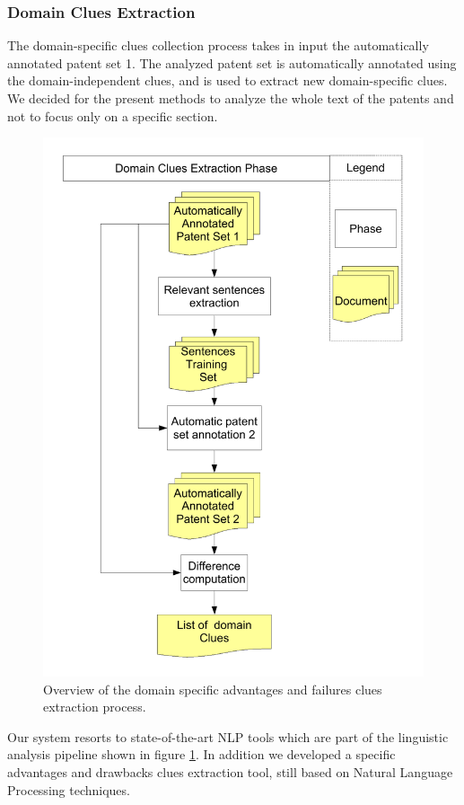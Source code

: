 \documentclass[]{book}
\begin{document}
\subsubsection{Domain Clues
Extraction}\label{advdrwarticledomaincluecoll}

The domain-specific clues collection process takes in input the
automatically annotated patent set 1. The analyzed patent set is
automatically annotated using the domain-independent clues, and is used
to extract new domain-specific clues. We decided for the present methods
to analyze the whole text of the patents and not to focus only on a
specific section.

\begin{figure}

{\centering \includegraphics[width=0.8\linewidth]{_bookdown_files/figures/pointer-expansion-phase} 

}

\caption{Overview of the domain specific advantages and failures clues extraction process.}\label{fig:advdrwarticleprocessfigclueexpansionphase}
\end{figure}

Our system resorts to state-of-the-art NLP tools which are part of the
linguistic analysis pipeline shown in figure
\ref{fig:advdrwarticleprocessfigclueexpansionphase}. In addition we
developed a specific advantages and drawbacks clues extraction tool,
still based on Natural Language Processing techniques.
\end{document}
